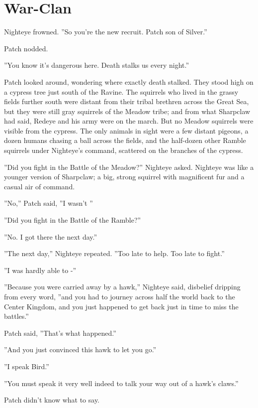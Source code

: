 \documentclass[12pt]{book}
\begin{document}
\section{War-Clan}

 Nighteye frowned. ''So you're the new recruit. Patch son of Silver.''\par
 Patch nodded.\par
 ''You know it's dangerous here. Death stalks us every night.''\par
 Patch looked around, wondering where exactly death stalked. They stood high on a cypress tree just south of the Ravine. The squirrels who lived in the grassy fields further south were distant from their tribal brethren across the Great Sea, but they were still gray squirrels of the Meadow tribe; and from what Sharpclaw had said, Redeye and his army were on the march. But no Meadow squirrels were visible from the cypress. The only animals in sight were a few distant pigeons, a dozen humans chasing a ball across the fields, and the half-dozen other Ramble squirrels under Nighteye's command, scattered on the branches of the cypress.\par
 ''Did you fight in the Battle of the Meadow?'' Nighteye asked. Nighteye was like a younger version of Sharpclaw; a big, strong squirrel with magnificent fur and a casual air of command.\par
 ''No,'' Patch said, ''I wasn't %
''\par
 ''Did you fight in the Battle of the Ramble?''\par
 ''No. I got there the next day.''\par
 ''The next day,'' Nighteye repeated. ''Too late to help. Too late to fight.''\par
 ''I was hardly able to -''\par
 ''Because you were carried away by a hawk,'' Nighteye said, disbelief dripping from every word, ''and you had to journey across half the world back to the Center Kingdom, and you just happened to get back just in time to miss the battles.''\par
 Patch said, ''That's what happened.''\par
 ''And you just convinced this hawk to let you go.''\par
 ''I speak Bird.''\par
 ''You must speak it very well indeed to talk your way out of a hawk's claws.''\par
 Patch didn't know what to say.\par
\end{document}
